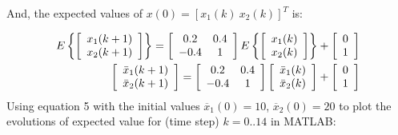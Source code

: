 \documentclass{article}
\begin{document}
And, the expected values of $x(0) = [x_1(k)\ x_2(k)]^T$ is:

\begin{eqnarray}
	E\left\{ {\left[ {\begin{array}{*{20}c}
	   {x_1 (k + 1)}  \\
	   {x_2 (k + 1)}  \\
	\end{array}} \right]} \right\} = \left[ {\begin{array}{*{20}c}
	   {0.2} & {0.4}  \\
	   { - 0.4} & 1  \\
	\end{array}} \right]E\left\{ {\left[ {\begin{array}{*{20}c}
	   {x_1 (k)}  \\
	   {x_2 (k)}  \\
	\end{array}} \right]} \right\} + \left[ {\begin{array}{*{20}c}
	   0  \\
	   1  \\
	\end{array}} \right]\\
	\left[ {\begin{array}{*{20}c}
	   {\bar x_1 (k + 1)}  \\
	   {\bar x_2 (k + 1)}  \\
	\end{array}} \right] = \left[ {\begin{array}{*{20}c}
	   {0.2} & {0.4}  \\
	   { - 0.4} & 1  \\
	\end{array}} \right]\left[ {\begin{array}{*{20}c}
	   {\bar x_1 (k)}  \\
	   {\bar x_2 (k)}  \\
	\end{array}} \right] + \left[ {\begin{array}{*{20}c}
	   0  \\
	   1  \\
	\end{array}} \right]
\end{eqnarray}
Using equation 5 with the initial values $\overline{x}_1(0) = 10$, $\overline{x}_2(0) = 20$ to plot 
the evolutions of expected value for (time step) $k=0..14$ in MATLAB:\\\\
\end{document}
